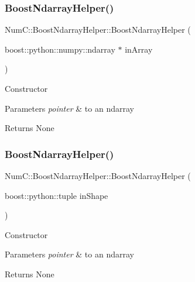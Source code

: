 \subsubsection{\texorpdfstring{Boost\+Ndarray\+Helper()}{BoostNdarrayHelper()}\hspace{0.1cm}{\footnotesize\ttfamily [1/2]}}
{\footnotesize\ttfamily Num\+C\+::\+Boost\+Ndarray\+Helper\+::\+Boost\+Ndarray\+Helper (\begin{DoxyParamCaption}\item[{boost\+::python\+::numpy\+::ndarray $\ast$}]{in\+Array }\end{DoxyParamCaption})\hspace{0.3cm}{\ttfamily [inline]}}

Constructor


\begin{DoxyParams}{Parameters}
{\em pointer} & to an ndarray\\
\hline
\end{DoxyParams}
\begin{DoxyReturn}{Returns}
None 
\end{DoxyReturn}
\mbox{\label{class_num_c_1_1_boost_ndarray_helper_ae267e8330b5ef7072ab9bb56cfa7e831}} 
\subsubsection{\texorpdfstring{Boost\+Ndarray\+Helper()}{BoostNdarrayHelper()}\hspace{0.1cm}{\footnotesize\ttfamily [2/2]}}
{\footnotesize\ttfamily Num\+C\+::\+Boost\+Ndarray\+Helper\+::\+Boost\+Ndarray\+Helper (\begin{DoxyParamCaption}\item[{boost\+::python\+::tuple}]{in\+Shape }\end{DoxyParamCaption})\hspace{0.3cm}{\ttfamily [inline]}}

Constructor


\begin{DoxyParams}{Parameters}
{\em pointer} & to an ndarray\\
\hline
\end{DoxyParams}
\begin{DoxyReturn}{Returns}
None 
\end{DoxyReturn}


